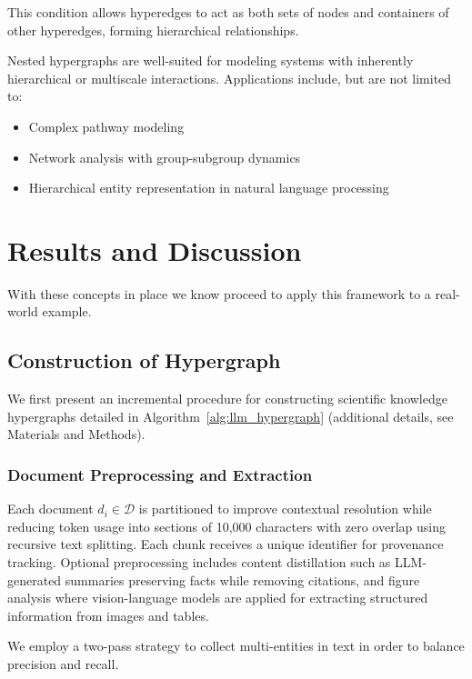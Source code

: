 \documentclass{article}
\begin{document}
This condition allows hyperedges to act as both sets of nodes and containers of other hyperedges, forming hierarchical relationships.

Nested hypergraphs are well-suited for modeling systems with inherently hierarchical or multiscale interactions. Applications include, but are not limited to:
\begin{itemize}
    \item Complex pathway modeling 
    \item Network analysis with group-subgroup dynamics
    \item Hierarchical entity representation in natural language processing
\end{itemize}


\section{Results and Discussion}\label{sec3}

With these concepts in place we know proceed to apply this framework to a real-world example. 

\subsection{Construction of Hypergraph}

We first present an incremental procedure for constructing scientific knowledge hypergraphs detailed in Algorithm~\ref{alg:llm_hypergraph} (additional details, see Materials and Methods).

\subsubsection{Document Preprocessing and Extraction}
Each document $d_i \in \mathcal{D}$ is partitioned to improve contextual resolution while reducing token usage into sections of 10,000 characters with zero overlap using recursive text splitting. Each chunk receives a unique identifier for provenance tracking. Optional preprocessing includes content distillation such as LLM-generated summaries preserving facts while removing citations, and figure analysis where vision-language models are applied for extracting structured information from images and tables. 

We employ a two-pass strategy to collect multi-entities in text in order to balance precision and recall. 
\end{document}
